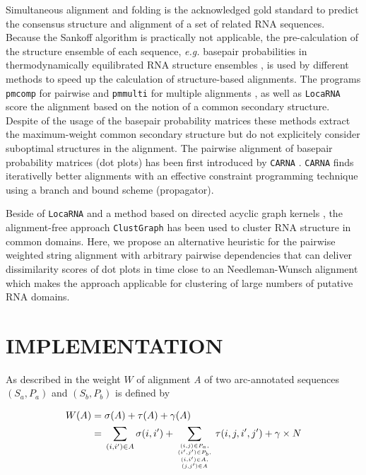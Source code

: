 \documentclass[a4paper,twoside]{article}
\newcommand\pmcomp{\texttt{pmcomp}}
\newcommand\pmmulti{\texttt{pmmulti}}
\newcommand\clustgraph{\texttt{ClustGraph}}
\newcommand\locarna{\texttt{LocaRNA}}
\newcommand\carna{\texttt{CARNA}}
\newcommand\eg{\textit{e.g.}}
\begin{document}
Simultaneous alignment and folding \cite{sankoff85} is the acknowledged gold
standard to predict the consensus structure and alignment of a set of related
RNA sequences. Because the Sankoff algorithm is practically not applicable, the
pre-calculation of the structure ensemble of each sequence, \eg{} basepair
probabilities in thermodynamically equilibrated RNA structure ensembles
\cite{McCaskill:1990}, is used by different methods to speed up the calculation
of structure-based alignments. The programs \pmcomp{} for pairwise and
\pmmulti{} for multiple alignments \cite{Hofacker15073017}, as well as
\locarna{} \cite{Will17432929} score the alignment based on the notion of a
common secondary structure. Despite of the usage of the basepair probability
matrices these methods extract the maximum-weight common secondary structure but
do not explicitely consider suboptimal structures in the alignment. The pairwise
alignment of basepair probability matrices (dot plots) has been first introduced
by \carna{} \cite{Palu2010,Sorescu2012}. \carna{} finds iterativelly better
alignments with an effective constraint programming technique using a branch and
bound scheme (propagator).

Beside of \locarna{} and a method based on directed acyclic graph kernels
\cite{Sato18647390}, the alignment-free approach \clustgraph{}
\cite{Heyne22689765} has been used to cluster RNA structure in common domains.
Here, we propose an alternative heuristic for the pairwise weighted string
alignment with arbitrary pairwise dependencies that can deliver dissimilarity
scores of dot plots in time close to an Needleman-Wunsch alignment which makes
the approach applicable for clustering of large numbers of putative RNA domains.


\section{\uppercase{Implementation}}

\noindent As described in \cite{Palu2010} the weight $W$ of alignment \emph{A}
of two arc-annotated sequences $(S_a,P_a)$ and $(S_b,P_b)$ is defined by

\begin{equation}\label{eq1}
\begin{aligned}
	W(A) ={} & \sigma(A) + \tau(A) + \gamma(A) \\
	     ={} & \sum_{(i,i^\prime) \in A} \sigma(i,i^\prime) + \sum_{(i,j) \in
	P_a,\atop {(i^\prime,j^\prime) \in P_b,\atop {(i,i^\prime) \in
	A,\atop (j,j^\prime) \in A}}} \tau(i,j,i^\prime,j^\prime) + \gamma
	\times N
\end{aligned}
\end{equation}
\end{document}
